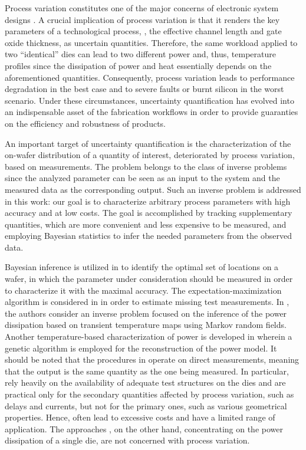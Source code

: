 Process variation constitutes one of the major concerns of electronic system designs \cite{chandrakasan2001, srivastava2010}. A crucial implication of process variation is that it renders the key parameters of a technological process, \eg, the effective channel length and gate oxide thickness, as uncertain quantities.
Therefore, the same workload applied to two ``identical'' dies can lead to two different power and, thus, temperature profiles since the dissipation of power and heat essentially depends on the aforementioned quantities.
Consequently, process variation leads to performance degradation in the best case and to severe faults or burnt silicon in the worst scenario.
Under these circumstances, uncertainty quantification has evolved into an indispensable asset of the fabrication workflows in order to provide guaranties on the efficiency and robustness of products.

An important target of uncertainty quantification is the characterization of the on-wafer distribution of a quantity of interest, deteriorated by process variation, based on measurements.
The problem belongs to the class of inverse problems since the analyzed parameter can be seen as an input to the system and the measured data as the corresponding output.
Such an inverse problem is addressed in this work: our goal is to characterize arbitrary process parameters with high accuracy and at low costs.
The goal is accomplished by tracking supplementary quantities, which are more convenient and less expensive to be measured, and employing Bayesian statistics \cite{gelman2004} to infer the needed parameters from the observed data.

Bayesian inference is utilized in \cite{zhang2010} to identify the optimal set of locations on a wafer, in which the parameter under consideration should be measured in order to characterize it with the maximal accuracy.
The expectation-maximization algorithm is considered in \cite{reda2009} in order to estimate missing test measurements.
In \cite{paek2012}, the authors consider an inverse problem focused on the inference of the power dissipation based on transient temperature maps using Markov random fields.
Another temperature-based characterization of power is developed in \cite{mesa-martinez2007} wherein a genetic algorithm is employed for the reconstruction of the power model.
It should be noted that the procedures in \cite{zhang2010, reda2009} operate on direct measurements, meaning that the output is the same quantity as the one being measured.
In particular, \cite{zhang2010, reda2009} rely heavily on the availability of adequate test structures on the dies and are practical only for the secondary quantities affected by process variation, such as delays and currents, but not for the primary ones, such as various geometrical properties.
Hence, \cite{zhang2010, reda2009} often lead to excessive costs and have a limited range of application.
The approaches \cite{paek2012, mesa-martinez2007}, on the other hand, concentrating on the power dissipation of a single die, are not concerned with process variation.

